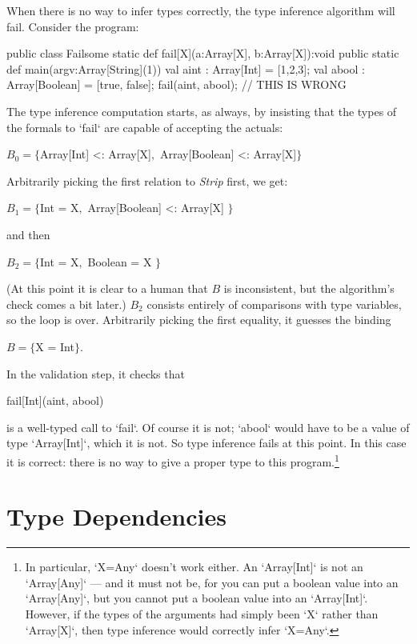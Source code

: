 \begin{ex}
When there is no way to infer types correctly, the type inference algorithm
will fail.   Consider the program: 
\begin{xten}
public class Failsome {
  static def fail[X](a:Array[X], b:Array[X]):void {}
  public static def main(argv:Array[String](1)) {
    val aint  : Array[Int]     = [1,2,3];
    val abool : Array[Boolean] = [true, false];
    fail(aint, abool);    // THIS IS WRONG
  }
}
\end{xten}
The type inference computation starts, as always, by insisting that the types
of the formals to \xcd`fail` are capable of accepting the actuals: 
\begin{xtenmath}
$B_0=\{$Array[Int] <: Array[X]$,$ Array[Boolean] <: Array[X]$\}$
\end{xtenmath}
Arbitrarily picking the first relation to {\it Strip} first, we get:
\begin{xtenmath}
$B_1=\{$Int = X$,$ Array[Boolean] <: Array[X] $\}$
\end{xtenmath}
and then 
\begin{xtenmath}
$B_2=\{$Int = X$,$ Boolean = X $\}$
\end{xtenmath}
(At this point it is clear to a human that $B$ is inconsistent, but the
algorithm's check comes a bit later.)
{$B_2$} consists entirely of comparisons with type variables, so the loop is
over.  Arbitrarily picking the first equality, it guesses the binding 
\begin{xtenmath}
$B=\{$X = Int$\}$.
\end{xtenmath}
In the validation step, it checks that 
\begin{xtenmath}
fail[Int](aint, abool)
\end{xtenmath}
is a well-typed call to \xcd`fail`.  Of course it is not; \xcd`abool` would
have to be a value of type \xcd`Array[Int]`, which it is not.  So type
inference fails at this point.  In this case it is correct: there is no way to
give a proper type to this program.\footnote{
In particular, \xcd`X=Any` doesn't work either.  An \xcd`Array[Int]` is not an
\xcd`Array[Any]` --- and it must not be, for you can put a boolean value into
an \xcd`Array[Any]`, but you cannot put a boolean value into an
\xcd`Array[Int]`.  However, if the types of the arguments had simply been 
\xcd`X` rather than \xcd`Array[X]`, then type inference would correctly infer
\xcd`X=Any`.
}
\end{ex}

\section{Type Dependencies}

